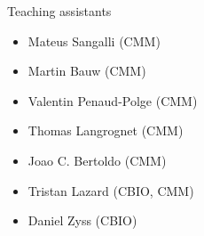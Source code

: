 \documentclass[xcolor=pdftex,dvipsnames,table,mathserif]{beamer}
\begin{document}
\begin{frame}{Teaching assistants}

      \begin{itemize}
      \item Mateus Sangalli (CMM)
      \item Martin Bauw (CMM)
      \item Valentin Penaud-Polge (CMM)
      \item Thomas Langrognet (CMM)
      \item Joao C. Bertoldo (CMM)
      \item Tristan Lazard (CBIO, CMM)
      \item Daniel Zyss (CBIO)
      \end{itemize}

\end{frame}









\end{document}
